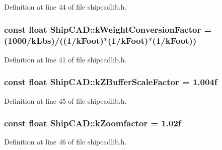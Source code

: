 Definition at line 44 of file shipcadlib.\-h.

\hypertarget{namespaceShipCAD_aa4319c8e7adfa68048f95c1614984036}{
\subsubsection[{k\-Weight\-Conversion\-Factor}]{\setlength{\rightskip}{0pt plus 5cm}const float Ship\-C\-A\-D\-::k\-Weight\-Conversion\-Factor = (1000/{\bf k\-Lbs})/((1/{\bf k\-Foot})$\ast$(1/{\bf k\-Foot})$\ast$(1/{\bf k\-Foot}))}}\label{namespaceShipCAD_aa4319c8e7adfa68048f95c1614984036}


Definition at line 41 of file shipcadlib.\-h.

\hypertarget{namespaceShipCAD_a519c591e5f5e3f60603b3133a4a2094e}{
\subsubsection[{k\-Z\-Buffer\-Scale\-Factor}]{\setlength{\rightskip}{0pt plus 5cm}const float Ship\-C\-A\-D\-::k\-Z\-Buffer\-Scale\-Factor = 1.\-004f}}\label{namespaceShipCAD_a519c591e5f5e3f60603b3133a4a2094e}


Definition at line 45 of file shipcadlib.\-h.

\hypertarget{namespaceShipCAD_a80babe3fef93f1117e1c410f8d3c22c2}{
\subsubsection[{k\-Zoomfactor}]{\setlength{\rightskip}{0pt plus 5cm}const float Ship\-C\-A\-D\-::k\-Zoomfactor = 1.\-02f}}\label{namespaceShipCAD_a80babe3fef93f1117e1c410f8d3c22c2}


Definition at line 46 of file shipcadlib.\-h.

